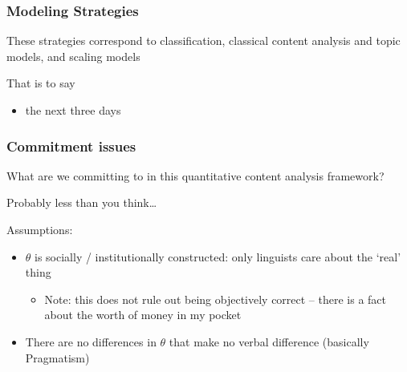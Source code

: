 \documentclass[11pt,compress,professionalfonts]{beamer}
\newcommand{\ita}{\begin{itemize}}
\newcommand{\itm}{\item[]}
\newcommand{\itz}{\end{itemize}}
\begin{document}
\begin{frame}[t]\frametitle{Modeling Strategies}

These strategies correspond to classification, classical content analysis and topic models, and scaling models

That is to say
\ita
\itm the next three days
\itz

\end{frame}
\begin{frame}[t]\frametitle{Commitment issues}

What are we committing to in this quantitative content analysis framework?

Probably less than you think\ldots

Assumptions:
\ita
\itm $\theta$ is socially / institutionally constructed: only linguists care about the `real' thing
\ita
\itm Note: this does not rule out being objectively correct -- there is a fact about the worth of money in my pocket
\itz
\itm There are no differences in $\theta$ that make no verbal difference (basically Pragmatism)
\itz

\end{frame}
\end{document}
